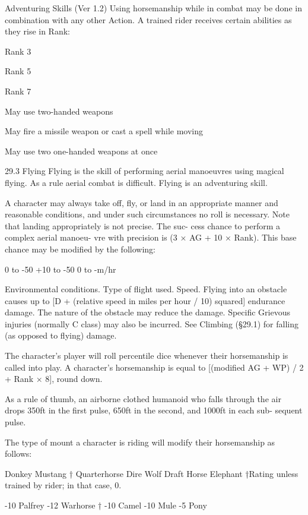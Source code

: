 \begin{Chapter}{Adventuring Skills (Ver 1.2)}
Using horsemanship while in combat may be done 
in  combination  with  any  other  Action.  A  trained 
rider receives certain abilities as they rise in Rank: 

Rank 
3  

Rank 
5  

Rank 
7  

May use two-handed weapons 

May fire a missile weapon or cast a spell 
while moving 

May  use  two  one-handed  weapons  at 
once 

29.3 Flying 
Flying is the skill of performing aerial manoeuvres 
using  magical  flying.  As  a  rule  aerial  combat  is 
difficult. Flying is an adventuring skill. 

A character may always take off, fly, or land in an 
appropriate manner and reasonable conditions, and 
under such circumstances no roll is necessary. Note 
that  landing  appropriately  is  not  precise.  The  suc-
cess  chance  to  perform  a  complex  aerial  manoeu-
vre  with  precision is  (3  ×  AG  +  10  ×  Rank).  This 
base chance may be modified by the following: 

 
 
 

0 to -50 
+10 to -50 
0 to -m/hr 

Environmental conditions. 
Type of flight used. 
Speed. 
Flying into an obstacle causes up to [D + (relative 
speed  in  miles  per  hour  /  10)  squared]  endurance 
damage. The nature of the obstacle may reduce the 
damage.  Specific  Grievous  injuries  (normally  C 
class)  may  also  be  incurred.  See  Climbing  (§29.1) 
for falling (as opposed to flying) damage. 

The  character’s  player  will  roll  percentile  dice 
whenever their horsemanship is called into play. A 
character’s  horsemanship  is  equal  to  [(modified 
AG + WP) / 2 + Rank × 8], round down. 

As  a  rule  of  thumb, an  airborne clothed humanoid 
who  falls  through  the  air  drops  350ft  in  the  first 
pulse, 650ft in the second, and 1000ft in each sub-
sequent pulse. 

The type of mount a character is riding will modify 
their horsemanship as follows: 

Donkey 
Mustang † 
Quarterhorse 
Dire Wolf 
Draft Horse 
Elephant 
†Rating unless trained by rider; in that case, 0. 

-10   Palfrey 
-12  Warhorse † 
-10  Camel 
-10  Mule 
-5 
Pony 
 

\end{Chapter}

